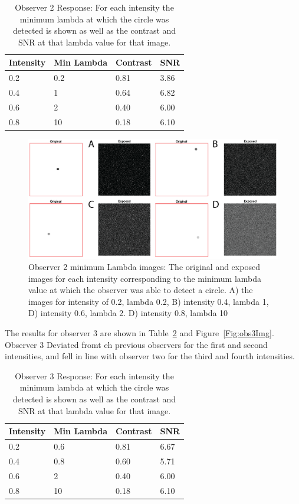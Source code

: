 \documentclass[12pt]{article}
\begin{document}
\begin{table}[H]
	\caption{Observer 2 Response: For each intensity the minimum lambda at which the circle was detected is shown as well as the contrast and SNR at that lambda value for that image.}
	\begin{tabular}{|l|l|l|l|}
		\hline
		Intensity & Min Lambda & Contrast & SNR  \\ \hline
		0.2       & 0.2        & 0.81     & 3.86 \\ \hline
		0.4       & 1          & 0.64     & 6.82 \\ \hline
		0.6       & 2          & 0.40     & 6.00 \\ \hline
		0.8       & 10         & 0.18     & 6.10 \\ \hline
	\end{tabular}
\label{Tab2}
\end{table}

\begin{figure}[H]
	
	\includegraphics[width=\textwidth]{Figures/Obs2_fig.png}
	\caption{Observer 2 minimum Lambda images: The original and exposed images for each intensity corresponding to the minimum lambda value at which the observer was able to detect a circle. A) the images for intensity of 0.2, lambda 0.2, B) intensity 0.4, lambda 1, D) intensity 0.6, lambda 2. D) intensity 0.8, lambda 10}
	\label{Fig:obs2Img}
\end{figure}

The results for observer 3 are shown in Table~\ref{Tab3} and Figure~\ref{Fig:obs3Img}. Observer 3 Deviated fromt eh previous observers for the first and second intensities, and fell in line with observer two for the third and fourth intensities.

\begin{table}[H]
	\caption{Observer 3 Response: For each intensity the minimum lambda at which the circle was detected is shown as well as the contrast and SNR at that lambda value for that image.}
	\begin{tabular}{|l|l|l|l|}
		\hline
		Intensity & Min Lambda & Contrast & SNR  \\ \hline
		0.2       & 0.6        & 0.81     & 6.67 \\ \hline
		0.4       & 0.8        & 0.60     & 5.71 \\ \hline
		0.6       & 2          & 0.40     & 6.00 \\ \hline
		0.8       & 10         & 0.18     & 6.10 \\ \hline
	\end{tabular}
\label{Tab3}
\end{table}
\end{document}

